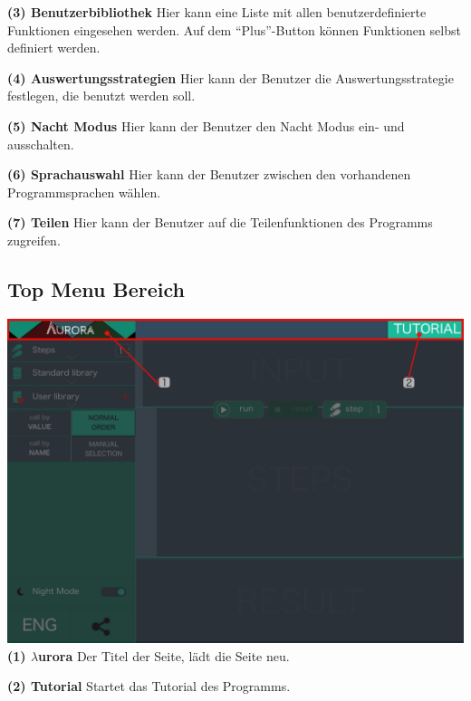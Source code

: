 \documentclass[parskip=full,11pt,twoside]{scrartcl}
\begin{document}
\textbf{(3) Benutzerbibliothek}
\newline Hier kann eine Liste mit allen benutzerdefinierte Funktionen eingesehen werden. Auf dem \enquote{Plus}-Button können Funktionen selbst definiert werden.

\textbf{(4) Auswertungsstrategien}
\newline Hier kann der Benutzer die Auswertungsstrategie festlegen, die benutzt werden soll.

\textbf{(5) Nacht Modus}
\newline Hier kann der Benutzer den Nacht Modus ein- und ausschalten.

\textbf{(6) Sprachauswahl}
\newline Hier kann der Benutzer zwischen den vorhandenen Programmsprachen wählen.

\textbf{(7) Teilen}
\newline Hier kann der Benutzer auf die Teilenfunktionen des Programms zugreifen.


\subsection{Top Menu Bereich}
\includegraphics[width=\textwidth]{../GUI-Design/tutorials/Tutorial_Top_Menu_Section.png}
\newline
\newline
\textbf{(1) $\lambda$urora}
\newline Der Titel der Seite, lädt die Seite neu.

\textbf{(2) Tutorial}
\newline Startet das Tutorial des Programms.
\end{document}
